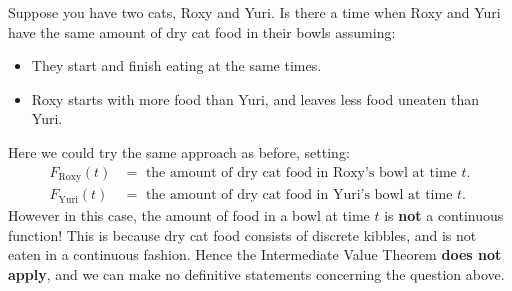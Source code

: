 \documentclass{ximera}
\begin{document}
\begin{example}
Suppose you have two cats, Roxy and Yuri. Is there a time when Roxy
and Yuri have the same amount of dry cat food in their bowls assuming:
  \begin{itemize}
  \item They start and finish eating at the same times.
  \item Roxy starts with more food than Yuri, and leaves less food
    uneaten than Yuri.
  \end{itemize}


  Here we could try the same approach as before, setting:
  \begin{align*}
    F_{\mathrm{Roxy}}(t) &= \text{ the amount of dry cat food in Roxy's bowl at time $t$.}\\
    F_{\mathrm{Yuri}}(t) &= \text{ the amount of dry cat food in Yuri's bowl at time $t$.}
  \end{align*}
  However in this case, the amount of food in a bowl at time $t$ is
  \textbf{not} a continuous function! This is because dry cat food
  consists of discrete kibbles, and is not eaten in a continuous
  fashion. Hence the Intermediate Value Theorem \textbf{does not
    apply}, and we can make no definitive statements concerning the
  question above.
\end{example}
\end{document}
